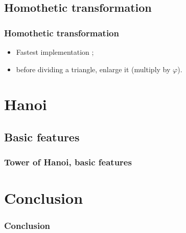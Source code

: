 \documentclass{beamer}
\begin{document}
	\subsection{Homothetic transformation}
	\begin{frame}
		\frametitle{Homothetic transformation}
		\begin{itemize}
			\item Fastest implementation ;
			\item before dividing a triangle, enlarge it (multiply by $\varphi$).
		\end{itemize}
	\end{frame}
	
	\section{Hanoi}
	\subsection{Basic features}
	\begin{frame}
		\frametitle{Tower of Hanoi, basic features}
	\end{frame}
	
	\section*{Conclusion}
	\begin{frame}
		\frametitle{Conclusion}
	\end{frame}
\end{document}
